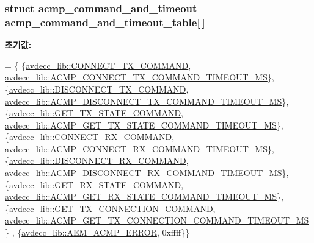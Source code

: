 \subsubsection[{\texorpdfstring{acmp\+\_\+command\+\_\+and\+\_\+timeout\+\_\+table}{acmp_command_and_timeout_table}}]{\setlength{\rightskip}{0pt plus 5cm}struct {\bf acmp\+\_\+command\+\_\+and\+\_\+timeout} acmp\+\_\+command\+\_\+and\+\_\+timeout\+\_\+table\mbox{[}$\,$\mbox{]}}\hypertarget{namespaceavdecc__lib_1_1utility_a4b62d8a155f4c1e1f99fe7ddd1cf99e1}{}\label{namespaceavdecc__lib_1_1utility_a4b62d8a155f4c1e1f99fe7ddd1cf99e1}
{\bfseries 초기값\+:}
\begin{DoxyCode}
=
        \{
            \{\hyperlink{namespaceavdecc__lib_a88737ea8b50ed2922581a6f86e0cfc9fa13cdd72dc2a960421a4cbad033c123e7}{avdecc\_lib::CONNECT\_TX\_COMMAND}, 
      \hyperlink{namespaceavdecc__lib_a5672955abd1a38146bde28647367857ead2c9cdd3767fdcfc7973bffe6fad27e6}{avdecc\_lib::ACMP\_CONNECT\_TX\_COMMAND\_TIMEOUT\_MS}\},
            \{\hyperlink{namespaceavdecc__lib_a88737ea8b50ed2922581a6f86e0cfc9fa84bcc9d96c221c5ac676b7a040589e73}{avdecc\_lib::DISCONNECT\_TX\_COMMAND}, 
      \hyperlink{namespaceavdecc__lib_a5672955abd1a38146bde28647367857ea119f46688bfcc69a5bb7c9887a0fbe7e}{avdecc\_lib::ACMP\_DISCONNECT\_TX\_COMMAND\_TIMEOUT\_MS}\},
            \{\hyperlink{namespaceavdecc__lib_a88737ea8b50ed2922581a6f86e0cfc9fa8928d750af94f120b1a599ddea19991c}{avdecc\_lib::GET\_TX\_STATE\_COMMAND}, 
      \hyperlink{namespaceavdecc__lib_a5672955abd1a38146bde28647367857ea429b49b68e80bdbcc480d2b2ba663771}{avdecc\_lib::ACMP\_GET\_TX\_STATE\_COMMAND\_TIMEOUT\_MS}\},
            \{\hyperlink{namespaceavdecc__lib_a88737ea8b50ed2922581a6f86e0cfc9fa79a5c397440d4a257df214fcddf41c11}{avdecc\_lib::CONNECT\_RX\_COMMAND}, 
      \hyperlink{namespaceavdecc__lib_a5672955abd1a38146bde28647367857ea6c03d3112f3139618f56b82329572bc4}{avdecc\_lib::ACMP\_CONNECT\_RX\_COMMAND\_TIMEOUT\_MS}\},
            \{\hyperlink{namespaceavdecc__lib_a88737ea8b50ed2922581a6f86e0cfc9fab638f8d36651a7872f1b5bd45c8146ec}{avdecc\_lib::DISCONNECT\_RX\_COMMAND}, 
      \hyperlink{namespaceavdecc__lib_a5672955abd1a38146bde28647367857eaeaaa3d4bbcbc28fb10d8511ac3d590cc}{avdecc\_lib::ACMP\_DISCONNECT\_RX\_COMMAND\_TIMEOUT\_MS}\},
            \{\hyperlink{namespaceavdecc__lib_a88737ea8b50ed2922581a6f86e0cfc9faf4094b5722eb461913bfa6ca2ed2a97f}{avdecc\_lib::GET\_RX\_STATE\_COMMAND}, 
      \hyperlink{namespaceavdecc__lib_a5672955abd1a38146bde28647367857ea1686702fc28aaf14397624208eaab4e9}{avdecc\_lib::ACMP\_GET\_RX\_STATE\_COMMAND\_TIMEOUT\_MS}\},
            \{\hyperlink{namespaceavdecc__lib_a88737ea8b50ed2922581a6f86e0cfc9faba982c74625d5937365f246d042e1d47}{avdecc\_lib::GET\_TX\_CONNECTION\_COMMAND}, 
      \hyperlink{namespaceavdecc__lib_a5672955abd1a38146bde28647367857eae76cd81da0e41f56dca5dc88dda423a1}{avdecc\_lib::ACMP\_GET\_TX\_CONNECTION\_COMMAND\_TIMEOUT\_MS}\}
      ,
            \{\hyperlink{namespaceavdecc__lib_a88737ea8b50ed2922581a6f86e0cfc9fa21a569627abb0966a40c2b0d32e9b5ce}{avdecc\_lib::AEM\_ACMP\_ERROR}, 0xffff\}\}
\end{DoxyCode}


